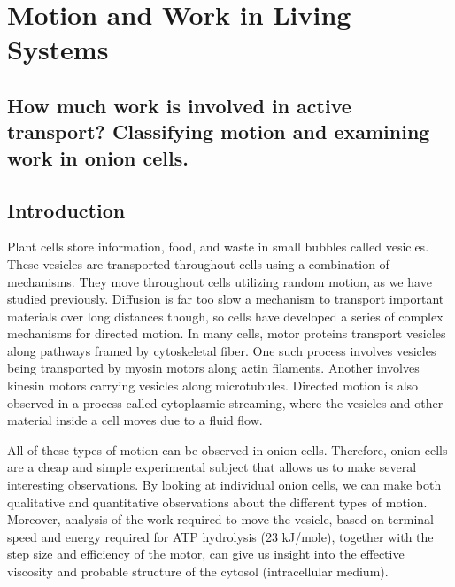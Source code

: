 \chapter{Motion and Work in Living Systems}
\thispagestyle{fancy}
%
\section{How much work is involved in active transport? Classifying motion and examining work in onion cells.}
\section*{Introduction}
Plant cells store information, food, and waste in small bubbles called vesicles.
These vesicles are transported throughout cells using a combination of mechanisms.
They move throughout cells utilizing random motion, as we have studied previously.
Diffusion is far too slow a mechanism to transport important materials over long distances though, so cells have developed a series of complex mechanisms for directed motion.
In many cells, motor proteins transport vesicles along pathways framed by cytoskeletal fiber.
One such process involves vesicles being transported by myosin motors along actin filaments.
Another involves kinesin motors carrying vesicles along microtubules.
Directed motion is also observed in a process called cytoplasmic streaming, where the vesicles and other material inside a cell moves due to a fluid flow.
\par
All of these types of motion can be observed in onion cells.
Therefore, onion cells are a cheap and simple experimental subject that allows us to make several interesting observations.
By looking at individual onion cells, we can make both qualitative and quantitative observations about the different types of motion.
Moreover, analysis of the work required to move the vesicle, based on terminal speed and energy required for ATP hydrolysis (23 kJ/mole), together with the step size and efficiency of the motor, can give us insight into the effective viscosity and probable structure of the cytosol (intracellular medium).
